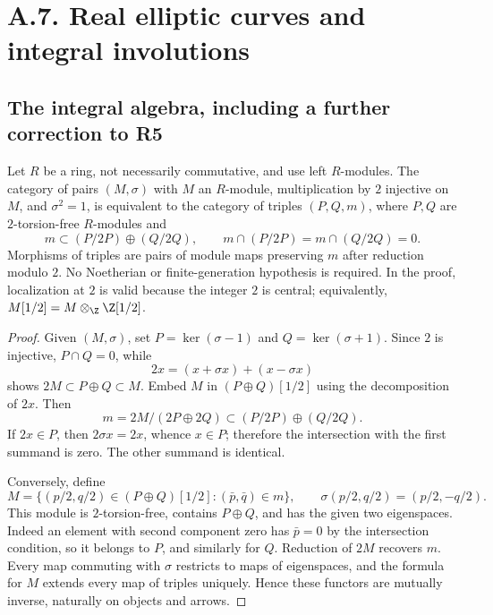 \section{A.7. Real elliptic curves and integral involutions}
\subsection{The integral algebra, including a further correction to R5}

\begin{proposition}\label{A7-gluing-modules}
Let $R$ be a ring, not necessarily commutative, and use left $R$-modules. The category of pairs $(M,\sigma)$ with $M$ an $R$-module, multiplication by $2$ injective on $M$, and $\sigma^2=1$, is equivalent to the category of triples $(P,Q,m)$, where $P,Q$ are $2$-torsion-free $R$-modules and
\[
 m\subset(P/2P)\oplus(Q/2Q),\qquad
 m\cap(P/2P)=m\cap(Q/2Q)=0.
\]
Morphisms of triples are pairs of module maps preserving $m$ after reduction modulo $2$. No Noetherian or finite-generation hypothesis is required. In the proof, localization at $2$ is valid because the integer $2$ is central; equivalently, $M[1/2]=M\otimes_{\Z}\Z[1/2]$.
\end{proposition}
\begin{proof}
Given $(M,\sigma)$, set $P=\ker(\sigma-1)$ and $Q=\ker(\sigma+1)$. Since $2$ is injective, $P\cap Q=0$, while
\[
 2x=(x+\sigma x)+(x-\sigma x)
\]
shows $2M\subset P\oplus Q\subset M$. Embed $M$ in $(P\oplus Q)[1/2]$ using the decomposition of $2x$. Then
\[
 m=2M/(2P\oplus2Q)\subset(P/2P)\oplus(Q/2Q).
\]
If $2x\in P$, then $2\sigma x=2x$, whence $x\in P$; therefore the intersection with the first summand is zero. The other summand is identical.

Conversely, define
\[
 M=\{(p/2,q/2)\in(P\oplus Q)[1/2]:
                (\bar{p},\bar{q})\in m\},
 \qquad \sigma(p/2,q/2)=(p/2,-q/2).
\]
This module is $2$-torsion-free, contains $P\oplus Q$, and has the given two eigenspaces. Indeed an element with second component zero has $\bar{p}=0$ by the intersection condition, so it belongs to $P$, and similarly for $Q$. Reduction of $2M$ recovers $m$. Every map commuting with $\sigma$ restricts to maps of eigenspaces, and the formula for $M$ extends every map of triples uniquely. Hence these functors are mutually inverse, naturally on objects and arrows.
\end{proof}


